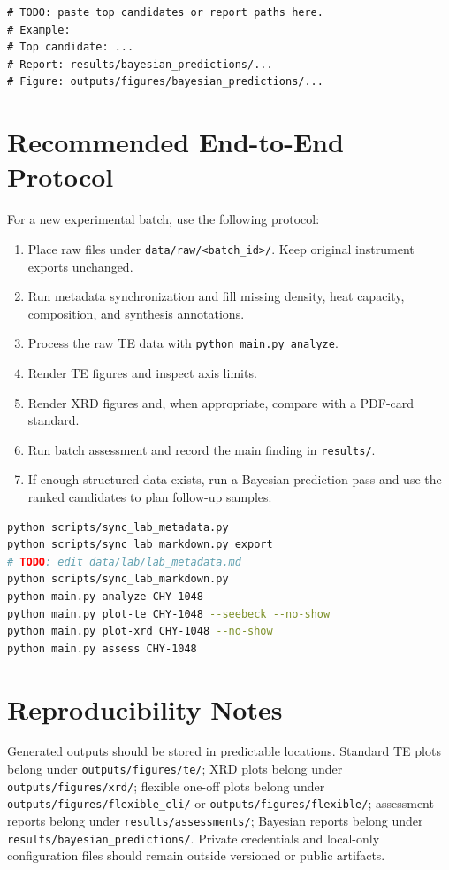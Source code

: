 \documentclass[10pt,twocolumn]{article}
\newcommand{\code}[1]{\nolinkurl{#1}}
\begin{document}
\begin{lstlisting}[caption={Terminal-output slot: prediction.}]
# TODO: paste top candidates or report paths here.
# Example:
# Top candidate: ...
# Report: results/bayesian_predictions/...
# Figure: outputs/figures/bayesian_predictions/...
\end{lstlisting}

\section{Recommended End-to-End Protocol}

For a new experimental batch, use the following protocol:

\begin{enumerate}[leftmargin=*]
  \item Place raw files under \code{data/raw/<batch_id>/}. Keep original
  instrument exports unchanged.
  \item Run metadata synchronization and fill missing density, heat capacity,
  composition, and synthesis annotations.
  \item Process the raw TE data with \code{python main.py analyze}.
  \item Render TE figures and inspect axis limits.
  \item Render XRD figures and, when appropriate, compare with a PDF-card
  standard.
  \item Run batch assessment and record the main finding in \code{results/}.
  \item If enough structured data exists, run a Bayesian prediction pass and
  use the ranked candidates to plan follow-up samples.
\end{enumerate}

\begin{lstlisting}[language=bash,caption={End-to-end command template.}]
python scripts/sync_lab_metadata.py
python scripts/sync_lab_markdown.py export
# TODO: edit data/lab/lab_metadata.md
python scripts/sync_lab_markdown.py
python main.py analyze CHY-1048
python main.py plot-te CHY-1048 --seebeck --no-show
python main.py plot-xrd CHY-1048 --no-show
python main.py assess CHY-1048
\end{lstlisting}

\section{Reproducibility Notes}

Generated outputs should be stored in predictable locations. Standard TE plots
belong under \code{outputs/figures/te/}; XRD plots belong under
\code{outputs/figures/xrd/}; flexible one-off plots belong under
\code{outputs/figures/flexible_cli/} or \code{outputs/figures/flexible/};
assessment reports belong under \code{results/assessments/}; Bayesian reports
belong under \code{results/bayesian_predictions/}. Private credentials and
local-only configuration files should remain outside versioned or public
artifacts.
\end{document}
